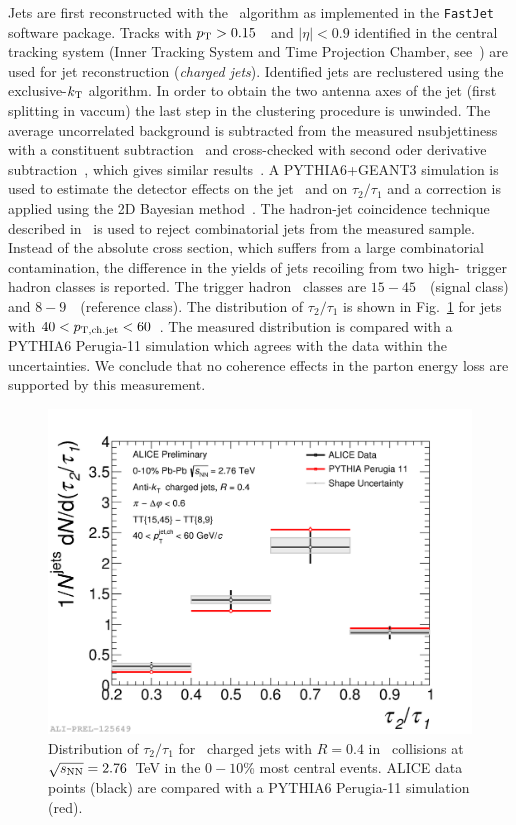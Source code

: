 \documentclass[10pt]{article}
\begin{document}
Jets are first reconstructed with the \antikt\ algorithm as implemented in the \texttt{FastJet}\cite{} software package.
Tracks with $p_{\rm T}>0.15$~\GeVc\ and $|\eta|<0.9$ identified in the central tracking system (Inner Tracking System and Time Projection Chamber, see~\cite{}) 
are used for jet reconstruction (\emph{charged jets}). 
Identified jets are reclustered using the exclusive-$k_{\rm T}$ algorithm. In order to obtain the two antenna axes of the jet (first splitting in vaccum) 
the last step in the clustering procedure is unwinded.
The average uncorrelated background is subtracted from the measured nsubjettiness with a constituent subtraction~\cite{} and cross-checked with second oder derivative subtraction~\cite{}, which gives similar results~\cite{}.
A PYTHIA6+GEANT3 simulation is used to estimate the detector effects on the jet \pt\ and on $\tau_2/\tau_1$ and a correction is applied using the 2D Bayesian method~\cite{}.
The hadron-jet coincidence technique described in~\cite{} is used to reject combinatorial jets from the measured sample. 
Instead of the absolute cross section, which suffers from a large combinatorial contamination, the difference in the yields of jets recoiling from two high-\pt\ trigger hadron classes is reported. 
The trigger hadron \pt\ classes are $15-45$~\GeVc\ (signal class) and $8-9$~\GeVc\ (reference class). The distribution of $\tau_2/\tau_1$ is shown in Fig.~\ref{fig:nsubjettiness} for jets with $40<p_{\rm T,ch.jet}<60$~\GeVc.
The measured distribution is compared with a PYTHIA6 Perugia-11 simulation which agrees with the data within the uncertainties. We conclude that no coherence effects in the parton energy loss are supported by this measurement.
\begin{figure}[tb]
\centering
\includegraphics[width=.5\textwidth]{img/2017-Feb-03-Tau2to1_40to60_Full_Results_0}
\caption{Distribution of $\tau_2/\tau_1$ for \antikt\ charged jets with $R=0.4$ in \PbPb\ collisions at $\sqrt{s_{\rm NN}}=2.76$~TeV in the $0-10$\% most central events. 
ALICE data points (black) are compared with a PYTHIA6 Perugia-11 simulation (red).}
\label{fig:nsubjettiness}
\end{figure}
\end{document}
